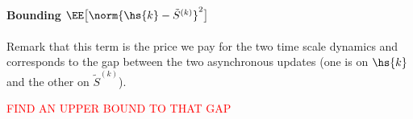 \documentclass[11pt]{article}
\makeatletter
\renewenvironment{proof}[1][\proofname]{%
   \par\pushQED{\qed}\normalfont%
   \topsep6\p@\@plus6\p@\relax
   \trivlist\item[\hskip\labelsep\bfseries#1]%
   \ignorespaces
}{%
   \popQED\endtrivlist\@endpefalse
}
\theoremstyle{t}
\makeatother
\begin{document}
\begin{proof}
\paragraph{ Bounding $ \EE\big[\norm{ \hs{k} -  \tilde{S}^{(k)} }^2\big] $} Remark that this term is the price we pay for the two time scale dynamics and corresponds to the gap between the two asynchronous updates (one is on  $\hs{k}$ and the other on $ \tilde{S}^{(k)}$).

\textcolor{red}{FIND AN UPPER BOUND TO THAT GAP}

%

\end{proof}
\end{document}
